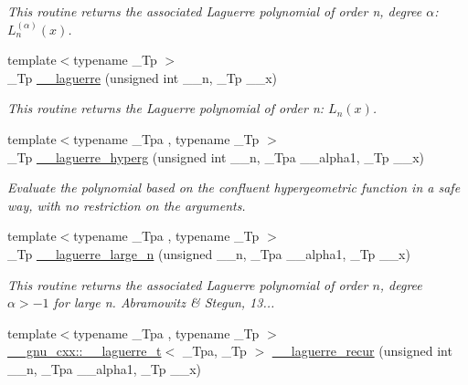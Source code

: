 \begin{DoxyCompactItemize}
\begin{DoxyCompactList}\small\item\em This routine returns the associated Laguerre polynomial of order n, degree $ \alpha $\+: $ L_n^{(\alpha)}(x) $. \end{DoxyCompactList}\item 
{\footnotesize template$<$typename \+\_\+\+Tp $>$ }\\\+\_\+\+Tp \hyperlink{namespacestd_1_1____detail_aa714c4983a3cb7d9d18e0c2c5a8f6826}{\+\_\+\+\_\+laguerre} (unsigned int \+\_\+\+\_\+n, \+\_\+\+Tp \+\_\+\+\_\+x)
\begin{DoxyCompactList}\small\item\em This routine returns the Laguerre polynomial of order n\+: $ L_n(x) $. \end{DoxyCompactList}\item 
{\footnotesize template$<$typename \+\_\+\+Tpa , typename \+\_\+\+Tp $>$ }\\\+\_\+\+Tp \hyperlink{namespacestd_1_1____detail_a7908be328a4546d77802076196ae4396}{\+\_\+\+\_\+laguerre\+\_\+hyperg} (unsigned int \+\_\+\+\_\+n, \+\_\+\+Tpa \+\_\+\+\_\+alpha1, \+\_\+\+Tp \+\_\+\+\_\+x)
\begin{DoxyCompactList}\small\item\em Evaluate the polynomial based on the confluent hypergeometric function in a safe way, with no restriction on the arguments. \end{DoxyCompactList}\item 
{\footnotesize template$<$typename \+\_\+\+Tpa , typename \+\_\+\+Tp $>$ }\\\+\_\+\+Tp \hyperlink{namespacestd_1_1____detail_abfce1c88345c266f5bcc9831766ed760}{\+\_\+\+\_\+laguerre\+\_\+large\+\_\+n} (unsigned \+\_\+\+\_\+n, \+\_\+\+Tpa \+\_\+\+\_\+alpha1, \+\_\+\+Tp \+\_\+\+\_\+x)
\begin{DoxyCompactList}\small\item\em This routine returns the associated Laguerre polynomial of order $ n $, degree $ \alpha > -1 $ for large n. Abramowitz \& Stegun, 13... \end{DoxyCompactList}\item 
{\footnotesize template$<$typename \+\_\+\+Tpa , typename \+\_\+\+Tp $>$ }\\\hyperlink{struct____gnu__cxx_1_1____laguerre__t}{\+\_\+\+\_\+gnu\+\_\+cxx\+::\+\_\+\+\_\+laguerre\+\_\+t}$<$ \+\_\+\+Tpa, \+\_\+\+Tp $>$ \hyperlink{namespacestd_1_1____detail_ab5344b00cf4ed8b39c9132ce0b9287af}{\+\_\+\+\_\+laguerre\+\_\+recur} (unsigned int \+\_\+\+\_\+n, \+\_\+\+Tpa \+\_\+\+\_\+alpha1, \+\_\+\+Tp \+\_\+\+\_\+x)

\end{DoxyCompactItemize}

